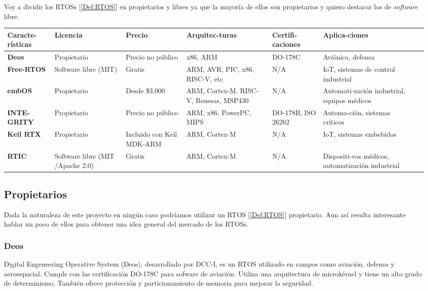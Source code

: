 Voy a dividir los RTOSs [\ref{Def:RTOS}] en propietarios y libres ya que la mayoría de ellos son propietarios y quiero destacar los de \emph{software} libre.

\begin{table}[!ht]
\centering
\renewcommand{\arraystretch}{1.5}
\begin{tabularx}{\textwidth}{|X|X|X|X|X|X|X|}
\hline
\textbf{Caracte-rísticas}	&  \textbf{Licencia}						& \textbf{Precio}		 & \textbf{Arquitec-turas}			& \textbf{Certifi-caciones}	& \textbf{Aplica-ciones} \\ \hline
\textbf{Deos}			&  \cellcolor{red!33}Propietario				& Precio no público		 & x86, ARM					& DO-178C			& Aviónica, defensa \\ \hline
\textbf{Free-RTOS}		&  \cellcolor{green!33}Software libre (MIT)			& Gratis			 & ARM, AVR, PIC, x86, RISC-V, etc.		& N/A				& IoT, sistemas de control industrial \\ \hline
\textbf{embOS}			&  \cellcolor{red!33}Propietario				& Desde \$3,000			 & ARM, Cortex-M, RISC-V, Renesas, MSP430	& N/A				& Automati-zación industrial, equipos médicos \\ \hline
\textbf{INTE-GRITY}		&  \cellcolor{red!33}Propietario				& Precio no público		 & ARM, x86, PowerPC, MIPS			& DO-178B, ISO 26262		& Automo-ción, sistemas críticos \\ \hline
\textbf{Keil RTX}		&  \cellcolor{red!33}Propietario				& Incluido con Keil MDK-ARM	 & ARM, Cortex-M				& N/A				& IoT, sistemas embebidos \\ \hline
\textbf{RTIC}			&  \cellcolor{green!33}Software libre (MIT /Apache 2.0)		& Gratis			 & ARM, Cortex-M				& N/A				& Dispositi-vos médicos, automatización industrial \\ \hline
\end{tabularx}
\label{tab:Comparativa de sistemas operativos de tiempo real}
\end{table}

\subsection{Propietarios}
Dada la naturaleza de este proyecto en ningún caso podríamos utilizar un RTOS [\ref{Def:RTOS}] propietario. Aun así resulta interesante hablar un poco de ellos para obtener una idea general del mercado de los RTOSs.

\subsubsection{Deos}
Digital Engeneering Operative System (Deos), desarrollado por DCC-I, es un RTOS utilizado en campos como aviación, defensa y aeroespacial. Cumple con las certificación DO-178C para sofware de aviación. Utiliza una arquitectura de microkérnel y tiene un alto grado de determinismo. También ofrece protección y particionamiento de memoria para mejorar la seguridad.

